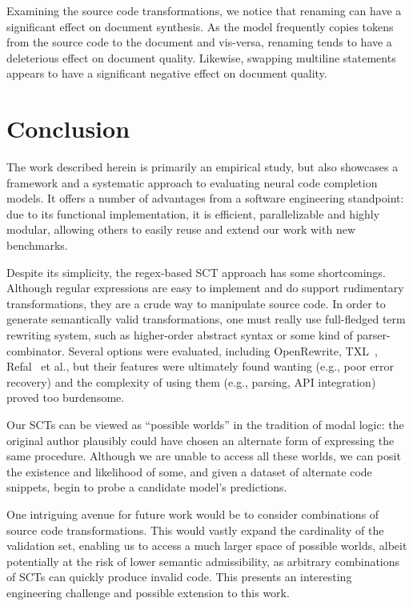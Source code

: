 \documentclass[usenames,dvipsnames]{article} %
\begin{document}
  Examining the source code transformations, we notice that renaming can have a significant effect on document synthesis. As the model frequently copies tokens from the source code to the document and vis-versa, renaming tends to have a deleterious effect on document quality. Likewise, swapping multiline statements appears to have a significant negative effect on document quality.

  \section{Conclusion}\label{sec:conclusion}

  The work described herein is primarily an empirical study, but also showcases a framework and a systematic approach to evaluating neural code completion models. It offers a number of advantages from a software engineering standpoint: due to its functional implementation, it is efficient, parallelizable and highly modular, allowing others to easily reuse and extend our work with new benchmarks.

  Despite its simplicity, the regex-based SCT approach has some shortcomings. Although regular expressions are easy to implement and do support rudimentary transformations, they are a crude way to manipulate source code. In order to generate semantically valid transformations, one must really use full-fledged term rewriting system, such as higher-order abstract syntax or some kind of parser-combinator. Several options were evaluated, including OpenRewrite, TXL~\citep{cordy2004txl}, Refal~\citep{gurin1991refal} et al., but their features were ultimately found wanting (e.g., poor error recovery) and the complexity of using them (e.g., parsing, API integration) proved too burdensome.

  Our SCTs can be viewed as ``possible worlds'' in the tradition of modal logic: the original author plausibly could have chosen an alternate form of expressing the same procedure. Although we are unable to access all these worlds, we can posit the existence and likelihood of some, and given a dataset of alternate code snippets, begin to probe a candidate model's predictions.

  One intriguing avenue for future work would be to consider combinations of source code transformations. This would vastly expand the cardinality of the validation set, enabling us to access a much larger space of possible worlds, albeit potentially at the risk of lower semantic admissibility, as arbitrary combinations of SCTs can quickly produce invalid code. This presents an interesting engineering challenge and possible extension to this work.
\end{document}
